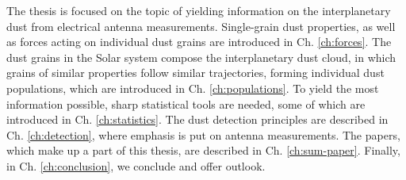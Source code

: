 The thesis is focused on the topic of yielding information on the interplanetary dust from electrical antenna measurements. Single-grain dust properties, as well as forces acting on individual dust grains are introduced in Ch. \ref{ch:forces}. The dust grains in the Solar system compose the interplanetary dust cloud, in which grains of similar properties follow similar trajectories, forming individual dust populations, which are introduced in Ch. \ref{ch:populations}. To yield the most information possible, sharp statistical tools are needed, some of which are introduced in Ch. \ref{ch:statistics}. The dust detection principles are described in Ch. \ref{ch:detection}, where emphasis is put on antenna measurements. The papers, which make up a part of this thesis, are described in Ch. \ref{ch:sum-paper}. Finally, in Ch. \ref{ch:conclusion}, we conclude and offer outlook.
